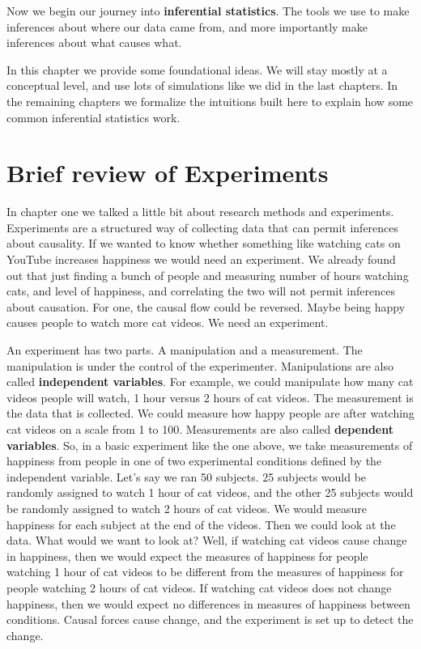 \documentclass[
]{book}
\begin{document}
Now we begin our journey into \textbf{inferential statistics}. The tools we use to make inferences about where our data came from, and more importantly make inferences about what causes what.

In this chapter we provide some foundational ideas. We will stay mostly at a conceptual level, and use lots of simulations like we did in the last chapters. In the remaining chapters we formalize the intuitions built here to explain how some common inferential statistics work.

\section{Brief review of Experiments}\label{brief-review-of-experiments}

In chapter one we talked a little bit about research methods and experiments. Experiments are a structured way of collecting data that can permit inferences about causality. If we wanted to know whether something like watching cats on YouTube increases happiness we would need an experiment. We already found out that just finding a bunch of people and measuring number of hours watching cats, and level of happiness, and correlating the two will not permit inferences about causation. For one, the causal flow could be reversed. Maybe being happy causes people to watch more cat videos. We need an experiment.

An experiment has two parts. A manipulation and a measurement. The manipulation is under the control of the experimenter. Manipulations are also called \textbf{independent variables}. For example, we could manipulate how many cat videos people will watch, 1 hour versus 2 hours of cat videos. The measurement is the data that is collected. We could measure how happy people are after watching cat videos on a scale from 1 to 100. Measurements are also called \textbf{dependent variables}. So, in a basic experiment like the one above, we take measurements of happiness from people in one of two experimental conditions defined by the independent variable. Let's say we ran 50 subjects. 25 subjects would be randomly assigned to watch 1 hour of cat videos, and the other 25 subjects would be randomly assigned to watch 2 hours of cat videos. We would measure happiness for each subject at the end of the videos. Then we could look at the data. What would we want to look at? Well, if watching cat videos cause change in happiness, then we would expect the measures of happiness for people watching 1 hour of cat videos to be different from the measures of happiness for people watching 2 hours of cat videos. If watching cat videos does not change happiness, then we would expect no differences in measures of happiness between conditions. Causal forces cause change, and the experiment is set up to detect the change.
\end{document}
